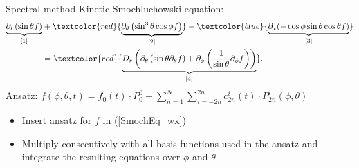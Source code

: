 
\begin{frame}{Spectral method}
	\scriptsize
	Kinetic Smochluchowski equation:
	\begin{align}
		\underbrace{\partial_{t}\left(\sin \theta f\right)}_{[1]} &+ \textcolor{red}{\underbrace{\partial_\theta\left( \sin ^3 \theta \cos \phi f\right)}_{[2]}} - \textcolor{blue}{\underbrace{\partial_x(-\cos\phi \sin\theta \cos\theta f)}_{[3]}} \nonumber \\ 
		&= \textcolor{red}{\underbrace{D_{r}\left(\partial_\theta \left(\sin \theta \partial_\theta f\right)+ \partial_\phi\left(\frac{1}{\sin \theta} \partial_\phi f\right)\right)}_{[4]}}. \label{SmochEq_wx}
	\end{align}	
	Ansatz: $f(\phi, \theta, t) = f_0(t) \cdot P_0^0 + \sum_{n=1}^{N} \sum_{i=-2n}^{2n} c^i_{2n}(t) \cdot P^i_{2n}(\phi, \theta)$
	\vspace{12pt}
	\begin{itemize}
		\item Insert ansatz for $f$ in (\ref{SmochEq_wx}) 
		\item Multiply consecutively with all basis functions used in the ansatz and integrate the resulting equations over $\phi$ and $\theta$
	\end{itemize}
\end{frame}

